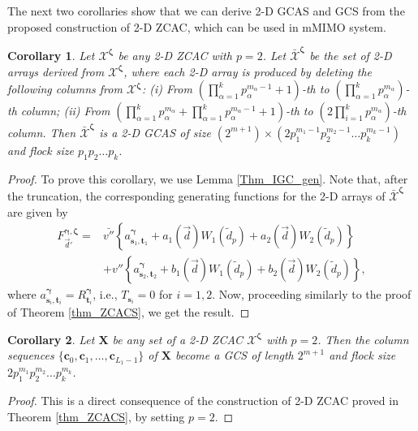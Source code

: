 \documentclass[pdflatex,sn-mathphys-num]{sn-jnl}%
\theoremstyle{thmstyleone}
\newtheorem{corollary}{Corollary}
\begin{document}
	
	The next two corollaries show that we can derive 2-D GCAS and GCS from the proposed construction of 2-D ZCAC, which can be used in mMIMO system.
	\begin{corollary}\label{cor_GCAS}
		Let $\mathcal{X}^{\bm{\zeta}}$ be any 2-D ZCAC with $p=2$. Let $\bar{\mathcal{X}}^{\bm{\zeta}} $ be the set of 2-D arrays derived from $\mathcal{X}^{\bm{\zeta}}$, where each 2-D array is produced by deleting the following columns from $\mathcal{X}^{\bm{\zeta}}$: (i) From $(\prod_{\alpha=1}^{k} p_\alpha^{m_\alpha-1}+1)$-th to $(\prod_{\alpha=1}^{k} p_\alpha^{m_\alpha})$-th column; (ii) From $(\prod_{\alpha=1}^{k} p_\alpha^{m_\alpha} + \prod_{\alpha=1}^{k} p_\alpha^{m_\alpha-1}+1)$-th to $(2 \prod_{i=1}^{k} p_\alpha^{m_\alpha})$-th column. Then $\bar{\mathcal{X}}^{\bm{\zeta}} $ is a 2-D GCAS of size $(2^{m+1}) \times (2 p_1^{m_1-1} p_2^{m_2-1}  \dots p_k^{m_k-1})$ and flock size $p_1 p_2 \dots p_k $.
	\end{corollary}
	\begin{proof}
		To prove this corollary, we use Lemma \ref{Thm_IGC_gen}. Note that, after the truncation, the corresponding generating functions for the 2-D arrays of $\bar{\mathcal{X}}^{\bm{\zeta}}$ are given by
		\begin{equation}
			\begin{split}
				F_{\vec{d}'}^{\bm{\gamma}, \bm{\zeta}} = &\bar{v''} \left\{a_{\mathbf{s}_1,\mathbf{t}_1}^{\bm{\gamma}} + a_1(\vec{d}) W_1 (\tilde{d}_p) + a_2(\vec{d}) W_2 (\tilde{d}_p)  \right\} \\
				&+ v'' \left\{a_{\mathbf{s}_2,\mathbf{t}_2}^{\bm{\gamma}} + b_1(\vec{d}) W _1(\tilde{d}_p) + b_2(\vec{d}) W _2(\tilde{d}_p) \right\},
			\end{split}
		\end{equation}
		where $a_{\mathbf{s}_i,\mathbf{t}_i}^{\bm{\gamma}}= R_{\mathbf{t}_i}^{\bm{\gamma}}$, i.e., $T_{\mathbf{s}_i}=0$ for $i=1,2$. Now, proceeding similarly to the proof of Theorem \ref{thm_ZCACS}, we get the result.
	\end{proof}
	
	\begin{corollary}\label{cor_CS}
		Let $\mathbf{X}$ be any set of a 2-D ZCAC $\mathcal{X}^{\bm{\zeta}}$ with $p=2$. Then the column sequences $\{\mathbf{c}_0, \mathbf{c}_1, \dots, \mathbf{c}_{L_1-1}\}$ of $\mathbf{X}$ become a GCS of length $2^{m+1}$ and flock size $2 p_1^{m_1} p_2^{m_2} \dots p_k^{m_k}$.
	\end{corollary}
	\begin{proof}
		This is a direct consequence of the construction of 2-D ZCAC proved in Theorem \ref{thm_ZCACS}, by setting $p=2$.
	\end{proof}
	
\end{document}
